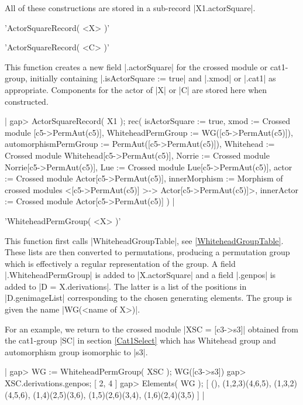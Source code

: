 All of these constructions are stored in a sub-record |X1.actorSquare|.

%

'ActorSquareRecord( <X> )'

'ActorSquareRecord( <C> )'

This function  creates a   new  field |.actorSquare| for the   crossed
module or  cat1-group, initially  containing |.isActorSquare :=  true|
and |.xmod|  or |.cat1| as  appropriate.  Components for  the actor of
|X| or |C| are stored here when constructed.

|    gap> ActorSquareRecord( X1 );
    rec(
      isActorSquare := true,
      xmod := Crossed module [c5->PermAut(c5)],
      WhiteheadPermGroup := WG([c5->PermAut(c5)]),
      automorphismPermGroup := PermAut([c5->PermAut(c5)]),
      Whitehead := Crossed module Whitehead[c5->PermAut(c5)],
      Norrie := Crossed module Norrie[c5->PermAut(c5)],
      Lue := Crossed module Lue[c5->PermAut(c5)],
      actor := Crossed module Actor[c5->PermAut(c5)],
      innerMorphism :=  Morphism of crossed modules
          <[c5->PermAut(c5)] >-> Actor[c5->PermAut(c5)]>,
      innerActor := Crossed module Actor[c5->PermAut(c5)] )  |

%

'WhiteheadPermGroup( <X> )'

This  function     first        calls   |WhiteheadGroupTable|,     see
\ref{WhiteheadGroupTable}.  These  lists   are  then   converted    to
permutations,  producing a  permutation group  which  is effectively a
regular representation of the group.  A field |.WhiteheadPermGroup| is
added to |X.actorSquare|  and  a field |.genpos|   is  added to  |D  =
X.derivations|.  The    latter  is a    list   of  the   positions  in
|D.genimageList| corresponding to the chosen generating elements.  The
group is given the name |WG(<name of X>)|.

For  an example,  we  return to the  crossed  module |XSC  = [c3->s3]|
obtained  from the cat1-group |SC|  in  section \ref{Cat1Select} which
has Whitehead group and automorphism group isomorphic to |s3|.

|    gap> WG := WhiteheadPermGroup( XSC );
    WG([c3->s3])
    gap> XSC.derivations.genpos;
    [ 2, 4 ]
    gap> Elements( WG );
    [ (), (1,2,3)(4,6,5), (1,3,2)(4,5,6), (1,4)(2,5)(3,6),
      (1,5)(2,6)(3,4), (1,6)(2,4)(3,5) ]  |

